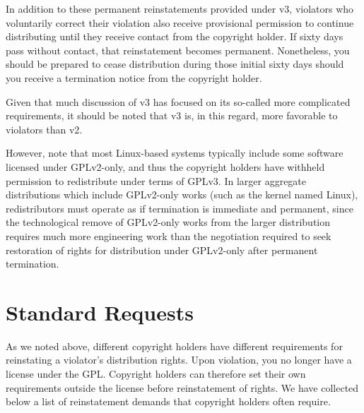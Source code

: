 In addition to these permanent reinstatements provided under v3, violators
who voluntarily correct their violation also receive provisional
permission to continue distributing until they receive contact from the
copyright holder.  If sixty days pass without contact, that reinstatement
becomes permanent.  Nonetheless, you should be prepared to cease
distribution during those initial sixty days should you receive a
termination notice from the copyright holder.

Given that much discussion of v3 has focused on its so-called more
complicated requirements, it should be noted that v3 is, in this regard,
more favorable to violators than v2.

However, note that most Linux-based systems typically include some software
licensed under GPLv2-only, and thus the copyright holders have withheld
permission to redistribute under terms of GPLv3.  In larger aggregate
distributions which include GPLv2-only works (such as the kernel named
Linux), redistributors must operate as if termination is immediate and
permanent, since the technological remove of GPLv2-only works from the larger
distribution requires much more engineering work than the negotiation
required to seek restoration of rights for distribution under GPLv2-only
after permanent termination.

\chapter{Standard Requests}

As we noted above, different copyright holders have different requirements
for reinstating a violator's distribution rights.  Upon violation, you no
longer have a license under the GPL\@.  Copyright holders can therefore
set their own requirements outside the license before reinstatement of
rights.  We have collected below a list of reinstatement demands that
copyright holders often require.

